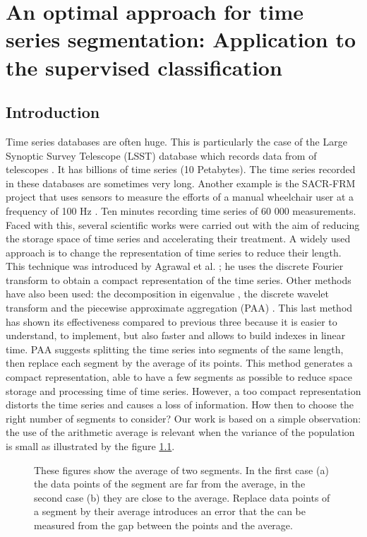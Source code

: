 \chapter{An optimal approach for time series segmentation: Application to the supervised classification}
\label{seg}

\section{Introduction}
Time series databases are often huge. This is particularly the case of the Large Synoptic Survey Telescope (LSST) database which records data from of telescopes \cite {lsst}. It has billions of time series (10 Petabytes). The time series recorded in these databases are sometimes very long. Another example is the  SACR-FRM project that uses sensors to measure the efforts of a  manual wheelchair user at a frequency of 100 Hz \cite{SACR-FRM}. Ten minutes recording time series of 60 000 measurements. Faced with this, several scientific works were carried out with the aim of reducing the storage space of time series and accelerating their treatment.  A widely used approach is to change the representation of time series to reduce their length. This technique was introduced by Agrawal et al. \cite{Agrawal1993}; he uses the discrete Fourier transform to obtain a compact representation of the time series.
 Other methods have also been used: the decomposition in eigenvalue \cite{Wu1996}, the  discrete wavelet transform \cite{Chan1999} and the piecewise approximate aggregation (PAA) \cite{keogh2001locally}. This last method has shown its effectiveness compared to previous three because it is easier to understand, to implement, but also faster and allows to build indexes in linear time. PAA suggests splitting the time series into segments of the same length, then replace each segment by the average of its points. This method generates a compact representation, able to have a few segments as possible to reduce space storage and processing time of time series.
 However, a too compact representation distorts the time series and causes a loss of information. How then to choose the right number of segments to consider? Our work is based on a simple observation: the use of the arithmetic average is relevant when the variance of the population is small as illustrated by the figure \ref{fig:average}.
 
 

\begin{figure}
\centering
{} 
\caption{These figures show the average of two segments. In the first
case (a) the data points of the segment are far from the average, in the second case (b) they are close to the average. Replace data points of a segment by their average introduces an error that the can be measured from the gap between the points and the average. }

\label{fig:average}
\end{figure}



